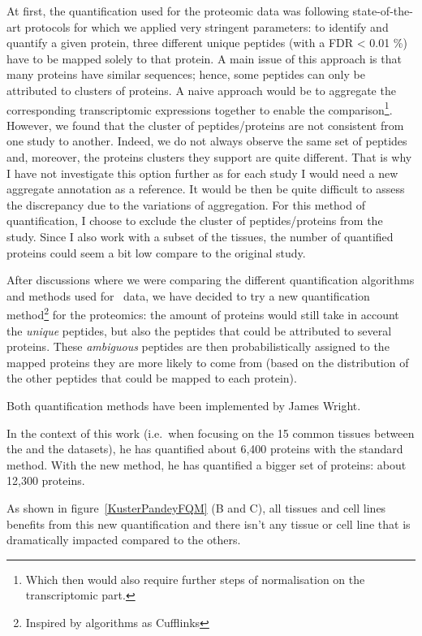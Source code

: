 At first, the quantification used for the proteomic data was following
state-of-the-art protocols for which we applied very stringent parameters:
to identify and quantify a given protein, three different unique peptides
(with a \gls{FDR} < 0.01 \%) have to be mapped solely to that protein. A main
issue of this approach is that many proteins have similar sequences; hence, some
peptides can only be attributed to clusters of proteins. A naive approach would
be to aggregate the corresponding transcriptomic expressions together to enable
the comparison\footnote{Which then would also require further steps of
normalisation on the transcriptomic part.}. However, we found that the cluster
of peptides/proteins are not consistent from one study to another. Indeed, we do
not always observe the same set of peptides and, moreover, the proteins clusters
they support are quite different. That is why I have not investigate this option
further as for each study I would need a new aggregate annotation as a reference.
It would be then be quite difficult to assess the discrepancy due to the
variations of aggregation. For this method of quantification, I choose to exclude
the cluster of peptides/proteins from the study. Since I also work with a subset
of the tissues, the number of quantified proteins could seem a bit low compare
to the original study.

After discussions where we were comparing the different quantification algorithms
and methods used for \Rnaseq\ data, we have decided to try a new quantification
method\footnote{Inspired by algorithms as Cufflinks} for the proteomics:
the amount of proteins would still take in account the \emph{unique} peptides,
but also the peptides that could be attributed to several proteins.
These \emph{ambiguous} peptides are then probabilistically assigned to the
mapped proteins they are more likely to come from (based on the distribution of
the other peptides that could be mapped to each protein).

Both quantification methods have been implemented by James Wright.

In the context of this work (i.e.\ when focusing on the 15 common tissues between
the  and the  datasets),
he has quantified about 6,400 proteins with
the standard method. With the new method, he has quantified a bigger set of
proteins: about 12,300 proteins.

As shown in figure~\ref{KusterPandeyFQM} (B and C),
all tissues and cell lines benefits from this new quantification and there isn't
any tissue or cell line that is dramatically impacted compared to the others.

